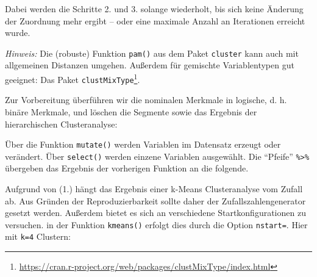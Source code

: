 \documentclass[12pt,ngerman,]{book}
\makeatletter
\newenvironment{Shaded}{\begin{snugshade}}{\end{snugshade}}
\newcommand{\KeywordTok}[1]{\textcolor[rgb]{0.13,0.29,0.53}{\textbf{{#1}}}}
\newcommand{\DataTypeTok}[1]{\textcolor[rgb]{0.13,0.29,0.53}{{#1}}}
\newcommand{\StringTok}[1]{\textcolor[rgb]{0.31,0.60,0.02}{{#1}}}
\newcommand{\NormalTok}[1]{{#1}}
\let\rmarkdownfootnote\footnote%
\def\footnote{\protect\rmarkdownfootnote}
\renewcommand{\href}[2]{#2\footnote{\url{#1}}}
\newenvironment{kframe}{%
\medskip{}
\setlength{\fboxsep}{.8em}
 \def\at@end@of@kframe{}%
 \ifinner\ifhmode%
  \def\at@end@of@kframe{\end{minipage}}%
  \begin{minipage}{\columnwidth}%
 \fi\fi%
 \def\FrameCommand##1{\hskip\@totalleftmargin \hskip-\fboxsep
 \colorbox{shadecolor}{##1}\hskip-\fboxsep
     \hskip-\linewidth \hskip-\@totalleftmargin \hskip\columnwidth}%
 \MakeFramed {\advance\hsize-\width
   \@totalleftmargin\z@ \linewidth\hsize
   \@setminipage}}%
 {\par\unskip\endMakeFramed%
 \at@end@of@kframe}
\renewenvironment{Shaded}{\begin{kframe}}{\end{kframe}}
\makeatother
\begin{document}
Dabei werden die Schritte 2. und 3. solange wiederholt, bis sich keine
Änderung der Zuordnung mehr ergibt -- oder eine maximale Anzahl an
Iterationen erreicht wurde.

\emph{Hinweis:} Die (robuste) Funktion \texttt{pam()} aus dem Paket
\texttt{cluster} kann auch mit allgemeinen Distanzen umgehen. Außerdem
für gemischte Variablentypen gut geeignet: Das Paket
\href{https://cran.r-project.org/web/packages/clustMixType/index.html}{\texttt{clustMixType}}.

Zur Vorbereitung überführen wir die nominalen Merkmale in logische, d.
h. binäre Merkmale, und löschen die Segmente sowie das Ergebnis der
hierarchischen Clusteranalyse:

\begin{Shaded}
\end{Shaded}

Über die Funktion \texttt{mutate()} werden Variablen im Datensatz
erzeugt oder verändert. Über \texttt{select()} werden einzene Variablen
ausgewählt. Die ``Pfeife'' \texttt{\%\textgreater{}\%} übergeben das
Ergebnis der vorherigen Funktion an die folgende.

Aufgrund von (1.) hängt das Ergebnis einer k-Means Clusteranalyse vom
Zufall ab. Aus Gründen der Reproduzierbarkeit sollte daher der
Zufallszahlengenerator gesetzt werden. Außerdem bietet es sich an
verschiedene Startkonfigurationen zu versuchen. in der Funktion
\texttt{kmeans()} erfolgt dies durch die Option \texttt{nstart=}. Hier
mit \texttt{k=4} Clustern:
\end{document}
